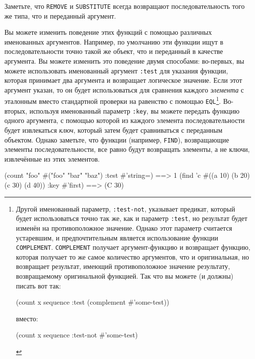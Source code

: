 Заметьте, что \lstinline{REMOVE} и \lstinline{SUBSTITUTE} всегда возвращают последовательность
того же типа, что и переданный аргумент.

Вы можете изменить поведение этих функций с помощью различных именованных аргументов.
Например, по умолчанию эти функции ищут в последовательности точно такой же объект, что и
переданный в качестве аргумента.  Вы можете изменить это поведение двумя способами: во-первых,
вы можете использовать именованный аргумент \lstinline{:test} для указания функции,
которая принимает два аргумента и возвращает логическое значение.  Если этот аргумент
указан, то он будет использоваться для сравнения каждого \textit{элемента} с эталонным вместо стандартной
проверки на равенство с помощью \lstinline{EQL}\footnote{Другой именованный параметр,
  \lstinline{:test-not}, указывает предикат, который будет использоваться точно так же, как и
  параметр \lstinline{:test}, но результат будет изменён на
  противоположное значение.  Однако этот параметр считается устаревшим, и предпочтительным
  является использование функции \lstinline{COMPLEMENT}.  \lstinline{COMPLEMENT} получает
  аргумент-функцию и возвращает функцию, которая получает то же самое количество
  аргументов, что и оригинальная, но возвращает результат, имеющий противоположное
  значение результату, возвращаемому оригинальной функцией.  Так что вы можете (и должны)
  писать вот так:

\begin{myverb}
  (count x sequence :test (complement #'some-test))
\end{myverb}

\noindent{}вместо:

\begin{myverb}
  (count x sequence :test-not #'some-test)
\end{myverb}

}. Во-вторых, используя именованный параметр \lstinline{:key}, вы можете передать функцию одного
аргумента, с помощью которой из каждого элемента последовательности будет извлекаться \textit{ключ},
который затем будет сравниваться с переданным объектом.  Однако заметьте, что
функции (например, \lstinline{FIND}), возвращающие элементы последовательности, все равно будут
возвращать элементы, а не ключи, извлечённые из этих элементов.

\begin{myverb}
  (count "foo" #("foo" "bar" "baz") :test #'string=)    ==> 1
  (find 'c #((a 10) (b 20) (c 30) (d 40)) :key #'first) ==> (C 30)
\end{myverb}

